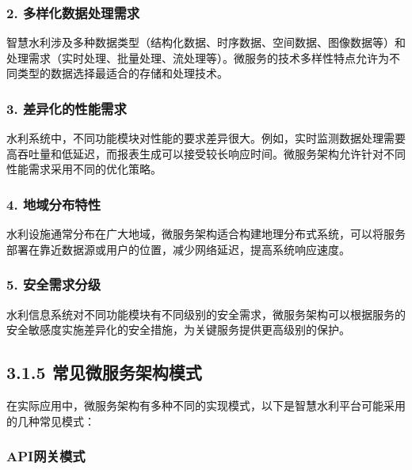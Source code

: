 \subsubsection{2.
多样化数据处理需求}\label{ux591aux6837ux5316ux6570ux636eux5904ux7406ux9700ux6c42}

智慧水利涉及多种数据类型（结构化数据、时序数据、空间数据、图像数据等）和处理需求（实时处理、批量处理、流处理等）。微服务的技术多样性特点允许为不同类型的数据选择最适合的存储和处理技术。

\subsubsection{3.
差异化的性能需求}\label{ux5deeux5f02ux5316ux7684ux6027ux80fdux9700ux6c42}

水利系统中，不同功能模块对性能的要求差异很大。例如，实时监测数据处理需要高吞吐量和低延迟，而报表生成可以接受较长响应时间。微服务架构允许针对不同性能需求采用不同的优化策略。

\subsubsection{4.
地域分布特性}\label{ux5730ux57dfux5206ux5e03ux7279ux6027}

水利设施通常分布在广大地域，微服务架构适合构建地理分布式系统，可以将服务部署在靠近数据源或用户的位置，减少网络延迟，提高系统响应速度。

\subsubsection{5.
安全需求分级}\label{ux5b89ux5168ux9700ux6c42ux5206ux7ea7}

水利信息系统对不同功能模块有不同级别的安全需求，微服务架构可以根据服务的安全敏感度实施差异化的安全措施，为关键服务提供更高级别的保护。

\subsection{3.1.5
常见微服务架构模式}\label{ux5e38ux89c1ux5faeux670dux52a1ux67b6ux6784ux6a21ux5f0f}

在实际应用中，微服务架构有多种不同的实现模式，以下是智慧水利平台可能采用的几种常见模式：

\subsubsection{API网关模式}\label{apiux7f51ux5173ux6a21ux5f0f}


